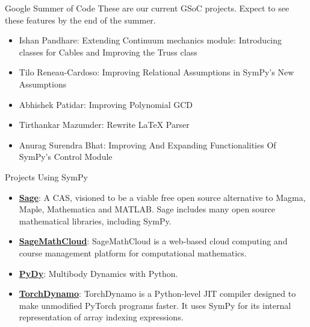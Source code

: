 \documentclass[xcolor=svgnames]{beamer}
\begin{document}
\begin{frame}{Google Summer of Code}
  These are our current GSoC projects. Expect to see these features by the end
  of the summer.
  \begin{itemize}
  \item Ishan Pandhare: Extending Continuum mechanics module: Introducing classes for Cables and Improving the Truss class
  \item Tilo Reneau-Cardoso: Improving Relational Assumptions in SymPy’s New Assumptions
  \item Abhishek Patidar: Improving Polynomial GCD
  \item Tirthankar Mazumder: Rewrite LaTeX Parser
  \item Anurag Surendra Bhat: Improving And Expanding Functionalities Of SymPy's Control Module
  \end{itemize}
\end{frame}


\begin{frame}{Projects Using SymPy}
\begin{itemize}
\item
  \href{http://www.sagemath.org/}{\textbf{Sage}}: A CAS, visioned to be
  a viable free open source alternative to Magma, Maple, Mathematica and
  MATLAB\@. Sage includes many open source mathematical libraries, including
  SymPy.
\item
  \href{https://cloud.sagemath.com}{\textbf{SageMathCloud}}:
  SageMathCloud is a web-based cloud computing and course management
  platform for computational mathematics.
\item
  \href{http://www.pydy.org/}{\textbf{PyDy}}: Multibody Dynamics with
  Python.
\item
  \href{https://pytorch.org/docs/stable/dynamo/index.html}{\textbf{TorchDynamo}}:
  TorchDynamo is a Python-level JIT compiler designed to make unmodified
  PyTorch programs faster. It uses SymPy for its internal representation of
  array indexing expressions.
\end{itemize}
  \end{frame}
\end{document}
